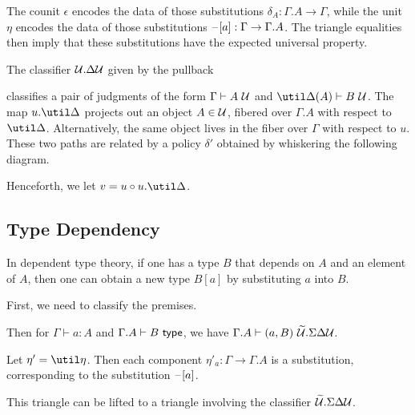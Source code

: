 \documentclass{amsart}
\begin{document}
The counit $\epsilon$ encodes the data of those substitutions $\delta_{A} : \Gamma.A \to \Gamma$, while the unit $\eta$ encodes the data of those substitutions $\mathord{\hspace{1pt}\text{--}\hspace{1pt}}[a] : \Gamma \to \Gamma.A$.
The triangle equalities then imply that these substitutions have the expected universal property.

The classifier $\mathcal{U}.\Delta\mathcal{U}$ given by the pullback

classifies a pair of judgments of the form $\Gamma \vdash A~\mathcal{U}$ and $\util\Delta(A) \vdash B~\Ty$.
The map $u.\util\Delta$ projects out an object $A \in \mathcal{U}$, fibered over $\Gamma.A$ with respect to $\util\Delta$.
Alternatively, the same object lives in the fiber over $\Gamma$ with respect to $u$.
These two paths are related by a policy $\delta'$ obtained by whiskering the following diagram.

Henceforth, we let $v = u \circ u.\util\Delta$.

\subsection{Type Dependency}
\label{sec:type-dependency}

In dependent type theory, if one has a type $B$ that depends on $A$ and an element of $A$, then one can obtain a new type $B[a]$ by substituting $a$ into $B$.
First, we need to classify the premises.

Then for $\Gamma \vdash a : A$ and $\Gamma.A \vdash B ~\mathsf{type}$, we have $\Gamma.A \vdash (a, B)~\widetilde{\mathcal{U}}.\Sigma\Delta\mathcal{U}$.

Let $\eta' = \util\eta$.
Then each component $\eta'_{a} : \Gamma \to \Gamma.A$ is a substitution, corresponding to the substitution $\mathord{\hspace{1pt}\text{--}\hspace{1pt}}[a]$.


This triangle can be lifted to a triangle involving the classifier $\widetilde{\mathcal{U}}.\Sigma\Delta\mathcal{U}$.

\end{document}
